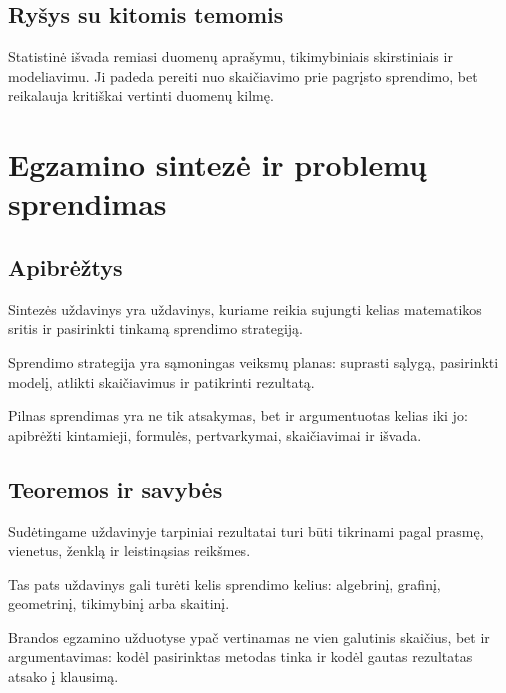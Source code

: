 \subsection{Ryšys su kitomis temomis}
Statistinė išvada remiasi duomenų aprašymu, tikimybiniais skirstiniais ir modeliavimu. Ji padeda pereiti nuo skaičiavimo prie pagrįsto sprendimo, bet reikalauja kritiškai vertinti duomenų kilmę.

\section{Egzamino sintezė ir problemų sprendimas}\label{sec:egzamino-sinteze-ir-problemu-sprendimas}

\subsection{Apibrėžtys}
\begin{apibreztis}
Sintezės uždavinys yra uždavinys, kuriame reikia sujungti kelias matematikos sritis ir pasirinkti tinkamą sprendimo strategiją.
\end{apibreztis}
\begin{apibreztis}
Sprendimo strategija yra sąmoningas veiksmų planas: suprasti sąlygą, pasirinkti modelį, atlikti skaičiavimus ir patikrinti rezultatą.
\end{apibreztis}
\begin{apibreztis}
Pilnas sprendimas yra ne tik atsakymas, bet ir argumentuotas kelias iki jo: apibrėžti kintamieji, formulės, pertvarkymai, skaičiavimai ir išvada.
\end{apibreztis}

\subsection{Teoremos ir savybės}
\begin{savybe}
Sudėtingame uždavinyje tarpiniai rezultatai turi būti tikrinami pagal prasmę, vienetus, ženklą ir leistinąsias reikšmes.
\end{savybe}
\begin{savybe}
Tas pats uždavinys gali turėti kelis sprendimo kelius: algebrinį, grafinį, geometrinį, tikimybinį arba skaitinį.
\end{savybe}
\begin{savybe}
Brandos egzamino užduotyse ypač vertinamas ne vien galutinis skaičius, bet ir argumentavimas: kodėl pasirinktas metodas tinka ir kodėl gautas rezultatas atsako į klausimą.
\end{savybe}


